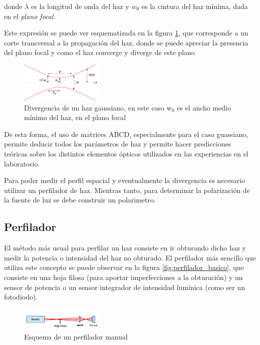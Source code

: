 donde $\lambda$ es la longitud de onda del haz y $w_0$ es la cintura del haz mínima, dada en el \emph{plano focal}. 

Este expresión se puede ver esquematizada en la figura \ref{fig:gaussian_beam_divergence}, que corresponde a un corte transversal a la propagación del haz, donde se puede apreciar la presencia del plano focal y como el haz converge y diverge de este plano

\begin{figure}[H]
\centering
\includegraphics[width=0.35\textwidth]{fig/gaussian_beam_divergence}
\caption{Divergencia de un haz gaussiano, en este caso w$_0$ es el ancho medio mínimo del haz, en el plano focal}
\label{fig:gaussian_beam_divergence}
\end{figure}

De esta forma, el uso de matrices ABCD, especialmente para el caso guassiano, permite deducir todos los parámetros de haz y permite hacer predicciones teóricas sobre los distintos elementos ópticos utilizados en las experiencias en el laboratorio.

Para poder medir el perfil espacial y eventualmente la divergencia es necesario utilizar un perfilador de haz. Mientras tanto, para determinar la polarización de la fuente de luz se debe construir un polarimetro.

\subsection{Perfilador}

El método más usual para perfilar un haz consiste en ir obturando dicho haz y medir la potencia o intensidad del haz no obturado. El perfilador más sencillo que utiliza este concepto se puede observar en la figura \ref{fig:perfilador_basico}, que consiste en una hoja filosa (para aportar imperfecciones a la obturación) y un sensor de potencia o un sensor integrador de intensidad lumínica (como ser un fotodiodo). 

\begin{figure}[H]
\centering
\includegraphics[width=0.35\textwidth]{fig/perfilador/esquema_basico}
\caption{Esquema de un perfilador manual}
\label{fig:perfilador/esquema_basico}
\end{figure}

